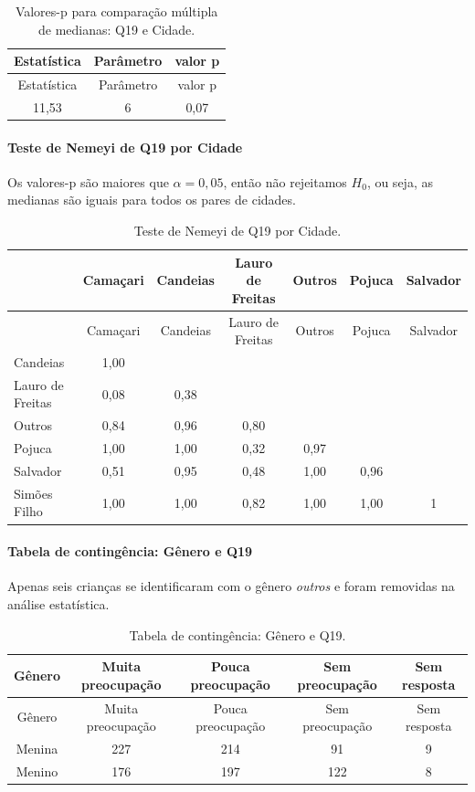 \documentclass[]{article}
\let\oldparagraph\paragraph
\renewcommand{\paragraph}[1]{\oldparagraph{#1}\mbox{}}
\begin{document}
\begin{longtable}[]{@{}ccc@{}}
\caption{\label{tab:unnamed-chunk-255}Valores-p para comparação múltipla de medianas: Q19 e Cidade.}\tabularnewline
\toprule
Estatística & Parâmetro & valor p\tabularnewline
\midrule
\endfirsthead
\toprule
Estatística & Parâmetro & valor p\tabularnewline
\midrule
\endhead
11,53 & 6 & 0,07\tabularnewline
\bottomrule
\end{longtable}

\hypertarget{teste-de-nemeyi-de-q19-por-cidade}{%
\paragraph{Teste de Nemeyi de Q19 por Cidade}\label{teste-de-nemeyi-de-q19-por-cidade}}

Os valores-p são maiores que \(\alpha=0,05\), então não rejeitamos \(H_0\), ou seja, as medianas são iguais para todos os pares de cidades.

\begin{longtable}[]{@{}lcccccc@{}}
\caption{\label{tab:unnamed-chunk-256}Teste de Nemeyi de Q19 por Cidade.}\tabularnewline
\toprule
& Camaçari & Candeias & Lauro de Freitas & Outros & Pojuca & Salvador\tabularnewline
\midrule
\endfirsthead
\toprule
& Camaçari & Candeias & Lauro de Freitas & Outros & Pojuca & Salvador\tabularnewline
\midrule
\endhead
Candeias & 1,00 & & & & &\tabularnewline
Lauro de Freitas & 0,08 & 0,38 & & & &\tabularnewline
Outros & 0,84 & 0,96 & 0,80 & & &\tabularnewline
Pojuca & 1,00 & 1,00 & 0,32 & 0,97 & &\tabularnewline
Salvador & 0,51 & 0,95 & 0,48 & 1,00 & 0,96 &\tabularnewline
Simões Filho & 1,00 & 1,00 & 0,82 & 1,00 & 1,00 & 1\tabularnewline
\bottomrule
\end{longtable}

\cleardoublepage

\hypertarget{tabela-de-continguxeancia-guxeanero-e-q19}{%
\paragraph{Tabela de contingência: Gênero e Q19}\label{tabela-de-continguxeancia-guxeanero-e-q19}}

Apenas seis crianças se identificaram com o gênero \emph{outros} e foram removidas na análise estatística.

\begin{longtable}[]{@{}ccccc@{}}
\caption{\label{tab:unnamed-chunk-257}Tabela de contingência: Gênero e Q19.}\tabularnewline
\toprule
Gênero & Muita preocupação & Pouca preocupação & Sem preocupação & Sem resposta\tabularnewline
\midrule
\endfirsthead
\toprule
Gênero & Muita preocupação & Pouca preocupação & Sem preocupação & Sem resposta\tabularnewline
\midrule
\endhead
Menina & 227 & 214 & 91 & 9\tabularnewline
Menino & 176 & 197 & 122 & 8\tabularnewline
\bottomrule
\end{longtable}
\end{document}
